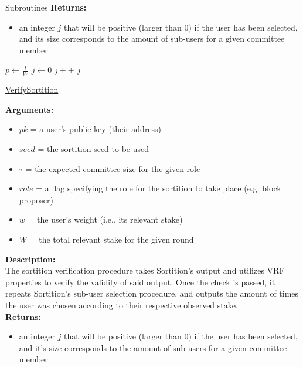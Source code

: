 \documentclass[10pt,a4paper]{article}
\begin{document}
\begin{section}{Subroutines}
\noindent \textbf{Returns:}
\begin{itemize}
    \item an integer $j$ that will be positive (larger than 0) if the user has been selected, 
    and its size corresponds to the amount of sub-users for a given committee member
  \end{itemize}



\begin{algorithm}[H]
    \begin{algorithmic}[H]
        \State $p \gets \frac{t}{W}$
        \State $j \gets 0$
        \While{$\frac{hash}{2^{hashlen}} \notin [\sum_{k=0}^j\mathsf{B}(k;w,p), \sum_{k=0}^{j+1}\mathsf{B}(k;w,p))$}
            \State $j++$
        \EndWhile
        \Return $j$
    \EndFunction
    \end{algorithmic}
    \caption{\underline{VerifySortition}}
\end{algorithm}

\noindent \textbf{Arguments:}
\begin{itemize}
    \item $pk$ = a user's public key (their address)
    \item $seed$ = the sortition seed to be used
    \item $\tau$ = the expected committee size for the given role
    \item $role$ = a flag specifying the role for the sortition to take place (e.g. block proposer)
    \item $w$ = the user's weight (i.e., its relevant stake)
    \item $W$ = the total relevant stake for the given round
  \end{itemize}

\noindent \textbf{Description:}\\
The sortition verification procedure takes Sortition's output and utilizes 
VRF properties to verify the validity of said output.
Once the check is passed, it repeats Sortition's sub-user selection procedure, 
and outputs the amount of times the user was chosen according to their respective 
observed stake.\\

\noindent \textbf{Returns:}
\begin{itemize}
    \item an integer $j$ that will be positive (larger than 0) if the user has been 
    selected, and it's size corresponds to the amount
    of sub-users for a given committee member
  \end{itemize}


\end{section}
\end{document}
